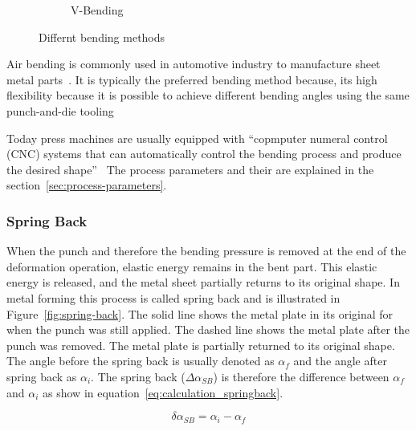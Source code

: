 \begin{figure}[h]
\begin{tcolorbox}[arc=0pt,boxrule=0.5pt, colback=white]
\begin{subfigure}{0.4\textwidth}
            \caption{V-Bending}
            \label{fig:v-bending}
        \end{subfigure}
        \hfill
    \end{tcolorbox}
    \caption{Differnt bending methods~\cite[pp. 416]{groover_fundamentalsmodernmanufacturing_2020}}
    \label{fig:bending-methods}
\end{figure}

Air bending is commonly used in automotive industry to manufacture sheet metal
parts~\cite[p. 342]{kim_predictionbendallowance_2007}.
It is typically the preferred bending method because, its high flexibility because it
is possible to achieve different bending angles using the same punch-and-die
tooling~\cite[p. 3]{miranda_formingspringbackprediction_2018}\cite[p. 1]{cruz_applicationmachinelearning_2021}

Today press machines are usually equipped with ``copmputer numeral control (CNC) systems that can automatically
control the bending process and
produce the desired shape''~\cite[p. 3]{miranda_formingspringbackprediction_2018}
The process parameters and their are explained in the section~\ref{sec:process-parameters}.

\subsubsection{Spring Back}\label{sec:spring-back}
When the punch and therefore the bending pressure is removed at the end of the deformation
operation, elastic energy remains in the bent part. This elastic energy is released,
and the
metal sheet partially returns to its original shape. \cite[p.
113-114]{groover_fundamentalsmodernmanufacturing_2020} In metal forming this process is
called
spring back and is illustrated in Figure~\ref{fig:spring-back}.
The solid line shows the metal plate in its original for when the punch was still
applied. The
dashed line shows the metal plate after the punch was removed. The metal plate is
partially
returned to its original shape. The angle before the spring back is usually denoted as $\alpha_f$
and the angle after spring back as $\alpha_i$.
The spring back ($\Delta \alpha_{SB}$) is therefore the difference between $\alpha_f$ and
$\alpha_i$ as show in equation~\ref*{eq:calculation_springback}. \cite[p.
6]{cruz_applicationmachinelearning_2021}

\begin{equation}
    \delta \alpha_{SB} = \alpha_i - \alpha_f
    \label{eq:calculation_springback}
\end{equation}

